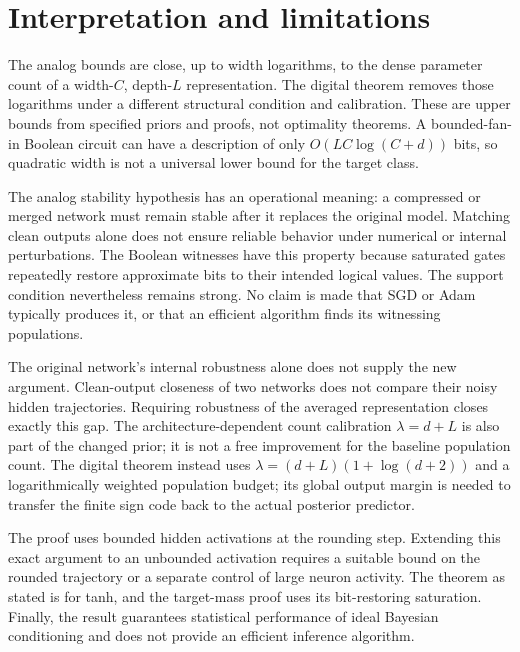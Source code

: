 \documentclass[11pt]{article}
\begin{document}




\section{Interpretation and limitations}

The analog bounds are close, up to width logarithms, to the dense parameter
count of a width-$C$, depth-$L$ representation. The digital theorem removes
those logarithms under a different structural condition and calibration.
These are upper bounds from specified priors and proofs, not optimality
theorems. A bounded-fan-in
Boolean circuit can have a description of only $O(LC\log(C+d))$ bits, so
quadratic width is not a universal lower bound for the target class.

The analog stability hypothesis has an operational meaning: a compressed or merged
network must remain stable after it replaces the original model. Matching
clean outputs alone does not ensure reliable behavior under numerical or
internal perturbations. The Boolean witnesses have this property because
saturated gates repeatedly restore approximate bits to their intended
logical values. The support condition nevertheless remains strong. No
claim is made that SGD or Adam typically produces it, or that an efficient
algorithm finds its witnessing populations.

The original network's internal robustness alone does not supply the new
argument. Clean-output closeness of two networks does not compare their
noisy hidden trajectories. Requiring robustness of the averaged
representation closes exactly this gap. The architecture-dependent count
calibration $\lambda=d+L$ is also part of the changed prior; it is not a
free improvement for the baseline population count. The digital theorem
instead uses $\lambda=(d+L)(1+\log(d+2))$ and a logarithmically weighted
population budget; its global output margin is needed to transfer the
finite sign code back to the actual posterior predictor.

The proof uses bounded hidden activations at the rounding step. Extending
this exact argument to an unbounded activation requires a suitable bound
on the rounded trajectory or a separate control of large neuron activity.
The theorem as stated is for tanh, and the target-mass proof uses its
bit-restoring saturation. Finally, the result guarantees statistical
performance of ideal Bayesian conditioning and does not provide an
efficient inference algorithm.
\end{document}
